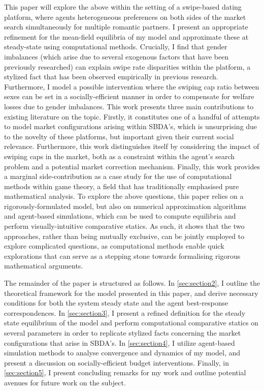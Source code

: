This paper will explore the above within the setting of a swipe-based dating platform, where agents heterogeneous preferences on both sides of the market search simultaneously for multiple romantic partners. I present an appropriate refinement for the mean-field equilibria of my model and approximate these at steady-state using computational methods. 
Crucially, I find that gender imbalances (which arise due to several exogenous factors that have been previously researched) can explain swipe rate disparities within the platform, a stylized fact that has been observed empirically in previous research. Furthermore, I model a possible intervention where the swiping cap ratio between sexes can be set in a socially-efficient manner in order to compensate for welfare losses due to gender imbalances.
This work presents three main contributions to existing literature on the topic. 
Firstly, it constitutes one of a handful of attempts to model market configurations arising within SBDA's, which is unsurprising due to the novelty of these platforms, but important given their current social relevance. 
Furthermore, this work distinguishes itself by considering the impact of swiping caps in the market, both as a constraint within the agent's search problem and a potential market correction mechanism.
Finally, this work provides a marginal side-contribution as a case study for the use of computational methods within game theory, a field that has traditionally emphasised pure mathematical analysis. To explore the above questions, this paper relies on a rigorously-formulated model, but also on numerical approximation algorithms and agent-based simulations, which can be used to compute equilibria and perform visually-intuitive comparative statics. 
As such, it shows that the two approaches, rather than being mutually exclusive, can be jointly employed to explore complicated questions, as computational methods enable quick explorations that can serve as a stepping stone towards formalising rigorous mathematical arguments.

The remainder of the paper is structured as follows. In \autoref{sec:section2}, I outline the theoretical framework for the model presented in this paper, and derive necessary conditions for both the system steady state and the agent best-response correspondences. In \autoref{sec:section3}, I present a refined definition for the steady state equilibrium of the model and perform computational comparative statics on several parameters in order to replicate stylized facts concerning the market configurations that arise in SBDA's. In \autoref{sec:section4}, I utilize agent-based simulation methods to analyse convergence and dynamics of my model, and present a discussion on socially-efficient budget interventions. Finally, in \autoref{sec:section5}, I present concluding remarks for my work and outline potential avenues for future work on the subject.

